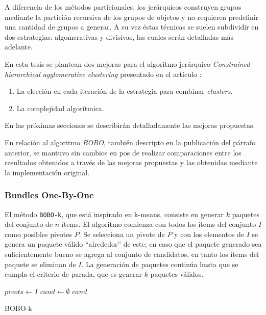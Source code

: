 A diferencia de los métodos particionales, los jerárquicos construyen grupos mediante la partición recursiva de los grupos de objetos y no requieren predefinir una cantidad de grupos a generar. A su vez éstas técnicas se suelen subdividir en dos estrategias: algomerativas y divisivas, las cuales serán detalladas más adelante.

En esta tesis se plantean dos mejoras para el algoritmo jerárquico \textit{Constrained hierarchical agglomerative clustering} presentado en el artículo \cite{journals/tkde/Amer-YahiaBCFMZ14}: 
\begin{enumerate}
	\item La elección en cada iteración de la estrategia para combinar \textit{clusters}.
	\item La complejidad algorítmica.
\end{enumerate}
En las próximas secciones se describirán detalladamente las mejoras propuestas.

En relación al algoritmo \textit{BOBO}, también descripto en la publicación del párrafo anterior, se mantuvo sin cambios en pos de realizar comparaciones entre los resultados obtenidos a través de las mejoras propuestas y las obtenidas mediante la implementación original.

\subsubsection{Bundles One-By-One}
El método \texttt{BOBO-k}, que está inspirado en k-means, consiste en generar $k$ paquetes del conjunto de $n$ ítems. El algoritmo comienza con todos los ítems del conjunto $I$ como posibles pivotes $P$. Se selecciona un pivote de $P$ y con los elementos de $I$ se genera un paquete válido ``alrededor'' de este; en caso que el paquete generado sea suficientemente bueno se agrega al conjunto de candidatos, en tanto los ítems del paquete se eliminan de $I$. La generación de paquetes continúa hasta que se cumpla el criterio de parada, que es generar $k$ paquetes válidos.

\begin{center}
	\begin{algorithm}[H]
	\DontPrintSemicolon
	\SetAlgoLined
		$pivots \leftarrow I$\;
		$cand \leftarrow \emptyset$\;
		\Return $cand$\;
	\caption{BOBO-k}\label{alg:bobo}
	\end{algorithm}
\end{center}

